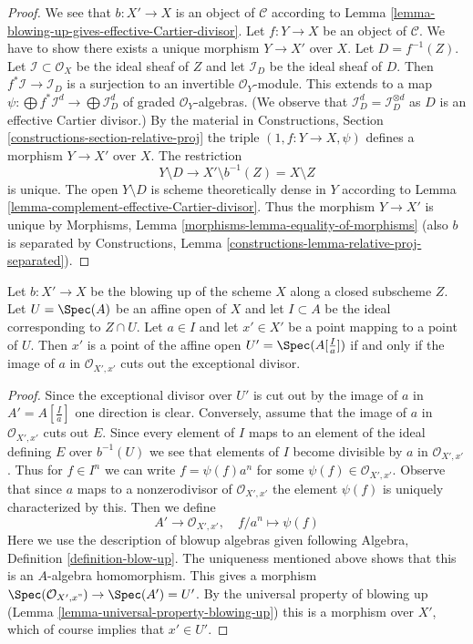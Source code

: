 \begin{proof}
We see that $b : X' \to X$ is an object of $\mathcal{C}$ according to
Lemma \ref{lemma-blowing-up-gives-effective-Cartier-divisor}.
Let $f : Y \to X$ be an object of $\mathcal{C}$. We have to show there exists
a unique morphism $Y \to X'$ over $X$. Let $D = f^{-1}(Z)$.
Let $\mathcal{I} \subset \mathcal{O}_X$ be the ideal sheaf of $Z$
and let $\mathcal{I}_D$ be the ideal sheaf of $D$. Then
$f^*\mathcal{I} \to \mathcal{I}_D$ is a surjection
to an invertible $\mathcal{O}_Y$-module. This extends to a map
$\psi : \bigoplus f^*\mathcal{I}^d \to \bigoplus \mathcal{I}_D^d$
of graded $\mathcal{O}_Y$-algebras. (We observe that
$\mathcal{I}_D^d = \mathcal{I}_D^{\otimes d}$ as $D$ is an
effective Cartier divisor.) By the material in
Constructions, Section \ref{constructions-section-relative-proj}
the triple $(1, f : Y \to X, \psi)$ defines a morphism $Y \to X'$ over $X$.
The restriction
$$
Y \setminus D \longrightarrow X' \setminus b^{-1}(Z) = X \setminus Z
$$
is unique. The open $Y \setminus D$ is scheme theoretically dense in $Y$
according to Lemma \ref{lemma-complement-effective-Cartier-divisor}. 
Thus the morphism $Y \to X'$ is unique by
Morphisms, Lemma \ref{morphisms-lemma-equality-of-morphisms}
(also $b$ is separated by Constructions, Lemma
\ref{constructions-lemma-relative-proj-separated}).
\end{proof}

\begin{lemma}
\label{lemma-characterize-affine-blowup}
Let $b : X' \to X$ be the blowing up of the scheme $X$ along a closed
subscheme $Z$. Let $U = \Spec(A)$ be an affine open of $X$ and let
$I \subset A$ be the ideal corresponding to $Z \cap U$.
Let $a \in I$ and let $x' \in X'$ be a point mapping to a point of $U$.
Then $x'$ is a point of the affine open $U' = \Spec(A[\frac{I}{a}])$
if and only if the image of $a$ in $\mathcal{O}_{X', x'}$ cuts
out the exceptional divisor.
\end{lemma}

\begin{proof}
Since the exceptional divisor over $U'$ is cut out by the image of
$a$ in $A' = A[\frac{I}{a}]$ one direction is clear. Conversely, assume
that the image of $a$ in $\mathcal{O}_{X', x'}$ cuts out $E$.
Since every element of $I$ maps to an element of the ideal
defining $E$ over $b^{-1}(U)$ we see that elements of $I$ become
divisible by $a$ in $\mathcal{O}_{X', x'}$. Thus for $f \in I^n$
we can write $f = \psi(f) a^n$ for some $\psi(f) \in \mathcal{O}_{X', x'}$.
Observe that since $a$ maps to a nonzerodivisor of $\mathcal{O}_{X', x'}$
the element $\psi(f)$ is uniquely characterized by this. Then we
define
$$
A' \longrightarrow \mathcal{O}_{X', x'},\quad
f/a^n \longmapsto \psi(f)
$$
Here we use the description of blowup algebras given following
Algebra, Definition \ref{definition-blow-up}. The uniqueness mentioned
above shows that this is an $A$-algebra homomorphism.
This gives a morphism $\Spec(\mathcal{O}_{X', x"}) \to \Spec(A') = U'$.
By the universal property of blowing up
(Lemma \ref{lemma-universal-property-blowing-up})
this is a morphism over
$X'$, which of course implies that $x' \in U'$.
\end{proof}

